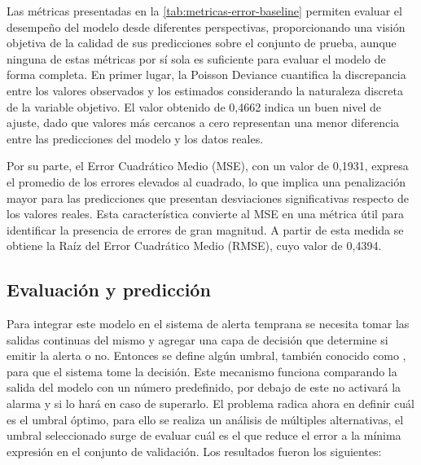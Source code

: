 
Las métricas presentadas en la \cref{tab:metricas-error-baseline} permiten evaluar el desempeño del modelo desde diferentes perspectivas, proporcionando una visión objetiva de la calidad de sus predicciones sobre el conjunto de prueba, aunque ninguna de estas métricas por sí sola es suficiente para evaluar el modelo de forma completa. En primer lugar, la Poisson Deviance cuantifica la discrepancia entre los valores observados y los estimados considerando la naturaleza discreta de la variable objetivo. El valor obtenido de 0,4662 indica un buen nivel de ajuste, dado que valores más cercanos a cero representan una menor diferencia entre las predicciones del modelo y los datos reales.

Por su parte, el Error Cuadrático Medio (MSE), con un valor de 0,1931, expresa el promedio de los errores elevados al cuadrado, lo que implica una penalización mayor para las predicciones que presentan desviaciones significativas respecto de los valores reales. Esta característica convierte al MSE en una métrica útil para identificar la presencia de errores de gran magnitud. A partir de esta medida se obtiene la Raíz del Error Cuadrático Medio (RMSE), cuyo valor de 0,4394.

\subsection{Evaluación y predicción}\label{evaluaciuxf3n-y-predicciuxf3n}

Para integrar este modelo en el sistema de alerta temprana se necesita tomar las salidas continuas del mismo y agregar una capa de decisión que determine si emitir la alerta o no. Entonces se define algún umbral, también conocido como , para que el sistema tome la decisión. Este mecanismo funciona comparando la salida del modelo con un número predefinido, por debajo de este no activará la alarma y si lo hará en caso de superarlo. El problema radica ahora en definir cuál es el umbral óptimo, para ello se realiza un análisis de múltiples alternativas, el umbral seleccionado surge de evaluar cuál es el que reduce el error a la mínima expresión en el conjunto de validación. Los resultados fueron los siguientes:

